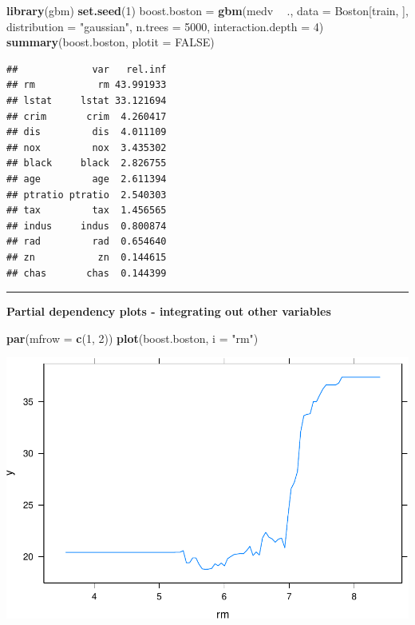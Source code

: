 \documentclass[]{article}
\newenvironment{Shaded}{\begin{snugshade}}{\end{snugshade}}
\newcommand{\DataTypeTok}[1]{\textcolor[rgb]{0.13,0.29,0.53}{#1}}
\newcommand{\DecValTok}[1]{\textcolor[rgb]{0.00,0.00,0.81}{#1}}
\newcommand{\KeywordTok}[1]{\textcolor[rgb]{0.13,0.29,0.53}{\textbf{#1}}}
\newcommand{\NormalTok}[1]{#1}
\newcommand{\OperatorTok}[1]{\textcolor[rgb]{0.81,0.36,0.00}{\textbf{#1}}}
\newcommand{\OtherTok}[1]{\textcolor[rgb]{0.56,0.35,0.01}{#1}}
\newcommand{\StringTok}[1]{\textcolor[rgb]{0.31,0.60,0.02}{#1}}
\begin{document}
\begin{Shaded}
\begin{Highlighting}[]
\KeywordTok{library}\NormalTok{(gbm)}
\KeywordTok{set.seed}\NormalTok{(}\DecValTok{1}\NormalTok{)}
\NormalTok{boost.boston =}\StringTok{ }\KeywordTok{gbm}\NormalTok{(medv }\OperatorTok{~}\StringTok{ }\NormalTok{., }\DataTypeTok{data =}\NormalTok{ Boston[train, ], }\DataTypeTok{distribution =} \StringTok{"gaussian"}\NormalTok{, }
    \DataTypeTok{n.trees =} \DecValTok{5000}\NormalTok{, }\DataTypeTok{interaction.depth =} \DecValTok{4}\NormalTok{)}
\KeywordTok{summary}\NormalTok{(boost.boston, }\DataTypeTok{plotit =} \OtherTok{FALSE}\NormalTok{)}
\end{Highlighting}
\end{Shaded}

\begin{verbatim}
##             var   rel.inf
## rm           rm 43.991933
## lstat     lstat 33.121694
## crim       crim  4.260417
## dis         dis  4.011109
## nox         nox  3.435302
## black     black  2.826755
## age         age  2.611394
## ptratio ptratio  2.540303
## tax         tax  1.456565
## indus     indus  0.800874
## rad         rad  0.654640
## zn           zn  0.144615
## chas       chas  0.144399
\end{verbatim}

\begin{center}\rule{0.5\linewidth}{\linethickness}\end{center}

\textbf{Partial dependency plots - integrating out other variables }

\begin{Shaded}
\begin{Highlighting}[]
\KeywordTok{par}\NormalTok{(}\DataTypeTok{mfrow =} \KeywordTok{c}\NormalTok{(}\DecValTok{1}\NormalTok{, }\DecValTok{2}\NormalTok{))}
\KeywordTok{plot}\NormalTok{(boost.boston, }\DataTypeTok{i =} \StringTok{"rm"}\NormalTok{)}
\end{Highlighting}
\end{Shaded}

\includegraphics{8Trees_files/figure-latex/unnamed-chunk-48-1.pdf}
\end{document}
